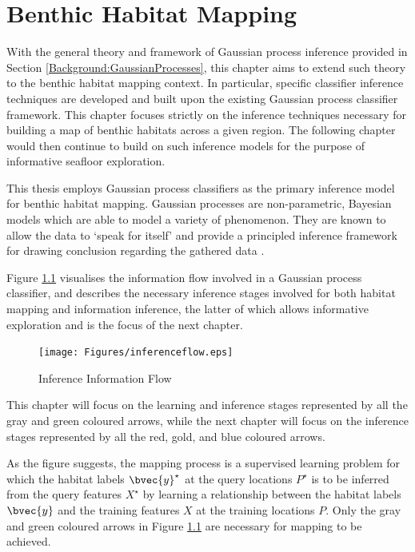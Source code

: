 \chapter{Benthic Habitat Mapping}
\label{BenthicHabitatMapping}
	
	With the general theory and framework of Gaussian process inference provided in Section \ref{Background:GaussianProcesses}, this chapter aims to extend such theory to the benthic habitat mapping context. In particular, specific classifier inference techniques are developed and built upon the existing Gaussian process classifier framework. This chapter focuses strictly on the inference techniques necessary for building a map of benthic habitats across a given region. The following chapter would then continue to build on such inference models for the purpose of informative seafloor exploration. 
	
	This thesis employs Gaussian process classifiers as the primary inference model for benthic habitat mapping. Gaussian processes are non-parametric, Bayesian models which are able to model a variety of phenomenon. They are known to allow the data to `speak for itself' and provide a principled inference framework for drawing conclusion regarding the gathered data \citep{GaussianProcessForMachineLearning}. 
	
	Figure \ref{Figure:InferenceFlow} visualises the information flow involved in a Gaussian process classifier, and describes the necessary inference stages involved for both habitat mapping and information inference, the latter of which allows informative exploration and is the focus of the next chapter.

	\begin{figure}[!htbp]
	\centering
		\texttt{[image: Figures/inferenceflow.eps]}
	\caption{Inference Information Flow}
	\label{Figure:InferenceFlow}
	\end{figure}	
			
	This chapter will focus on the learning and inference stages represented by all the {\color{Gray} gray} and {\color{ForestGreen} green} coloured arrows, while the next chapter will focus on the inference stages represented by all the {\color{OrangeRed} red}, {\color{YellowOrange} gold}, and {\color{Cerulean} blue} coloured arrows.
	
	As the figure suggests, the mapping process is a supervised learning problem for which the habitat labels $\bvec{y}^{\star}$ at the query locations $P^{\star}$ is to be inferred from the query features $X^{\star}$ by learning a relationship between the habitat labels $\bvec{y}$ and the training features $X$ at the training locations $P$. Only the {\color{Gray} gray} and {\color{ForestGreen} green} coloured arrows in Figure \ref{Figure:InferenceFlow} are necessary for mapping to be achieved.
	
